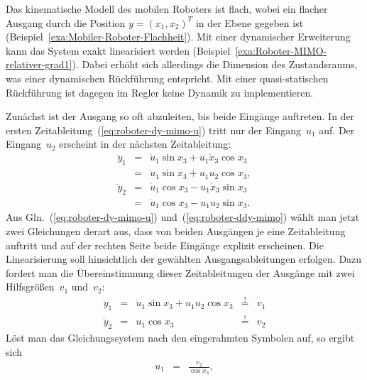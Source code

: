 \begin{example}
\label{exa:Mobiler-Roboter-quasi-statisch}Das kinematische Modell
des mobilen Roboters ist flach, wobei ein flacher Ausgang durch die
Position $y=(x_{1},x_{2})^{T}$ in der Ebene gegeben ist (Beispiel~\ref{exa:Mobiler-Roboter-Flachheit}).
Mit einer dynamischer Erweiterung kann das System exakt linearisiert
werden (Beispiel~\ref{exa:Roboter-MIMO-relativer-grad1}). Dabei
erhöht sich allerdings die Dimension des Zustandsraums, was einer
dynamischen Rückführung entspricht. Mit einer quasi-statischen Rückführung
ist dagegen im Regler keine Dynamik zu implementieren.

Zunächst ist der Ausgang so oft abzuleiten, bis beide Eingänge auftreten.
In der ersten Zeitableitung~(\ref{eq:roboter-dy-mimo-u}) tritt nur
der Eingang~$u_{1}$ auf. Der Eingang~$u_{2}$ erscheint in der
nächsten Zeitableitung:
\begin{equation}
\begin{array}{lcl}
\ddot{y}_{1} & = & \dot{u}_{1}\sin x_{3}+u_{1}\dot{x}_{3}\cos x_{3}\\
 & = & \dot{u}_{1}\sin x_{3}+u_{1}u_{2}\cos x_{3},\\
\ddot{y}_{2} & = & \dot{u}_{1}\cos x_{3}-u_{1}\dot{x}_{3}\sin x_{3}\\
 & = & \dot{u}_{1}\cos x_{3}-u_{1}u_{2}\sin x_{3}.
\end{array}\label{eq:roboter-ddy-mimo}
\end{equation}
Aus Gln.~(\ref{eq:roboter-dy-mimo-u}) und~(\ref{eq:roboter-ddy-mimo})
wählt man jetzt zwei Gleichungen derart aus, dass von beiden Ausgängen
je eine Zeitableitung auftritt und auf der rechten Seite beide Eingänge
explizit erscheinen. Die Linearisierung soll hinsichtlich der gewählten
Ausgangsableitungen erfolgen. Dazu fordert man die Übereinstimmung
dieser Zeitableitungen der Ausgänge mit zwei Hilfsgrößen~$v_{1}$
und~$v_{2}$:
\begin{equation}
\begin{array}{lclcl}
\ddot{y}_{1} & = & \dot{u}_{1}\sin x_{3}+u_{1}\boxed{u_{2}}\cos x_{3} & \stackrel{!}{=} & v_{1}\\
\dot{y}_{2} & = & \boxed{u_{1}}\cos x_{3} & \stackrel{!}{=} & v_{2}
\end{array}\label{eq:roboter-quasi-forderung-lin}
\end{equation}
Löst man das Gleichungssystem nach den eingerahmten Symbolen auf,
so ergibt sich
\begin{eqnarray}
u_{1} & = & \frac{v_{2}}{\cos x_{3}},\label{eq:roboter-quasi-u1}\\

\end{eqnarray}
\end{example}
